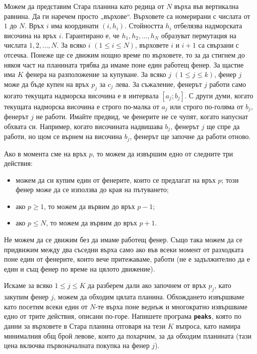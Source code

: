 \documentclass[12pt]{article}
\begin{document}
\renewcommand{\headerLang}{Български}
\renewcommand{\problemName}{?. PEAKS}

\renewcommand{\headerLeft}{IATI Day 1, Senior group}
\renewcommand{\headerRightFirst}{XVI INTERNATIONAL ADVANCED TOURNAMENT IN INFORMATICS}
\renewcommand{\headerRightSecond}{SHUMEN 2025}

\renewcommand{\tl}{$3$ сек.}
\renewcommand{\ml}{$256$ MB}
\problem{Задача \problemName}

Можем да представим Стара планина като редица от $N$ върха във вертикална равнина. Да ги наречем просто „върхове“. Върховете са номерирани с числата от $1$ до $N$. Връх $i$ има координати $(i, h_i)$. Стойността $h_i$ отбелязва надморската височина на връх $i$. Гарантирано е, че $h_1, h_2, \dots, h_ N$ образуват пермутация на числата $1, 2, \dots,  N$. За всяко $i$ $(1 \le i \le  N)$, върховете $i$ и $i+1$ са свързани с отсечка. Понеже ще се движим нощно време по върховете, то за да стигнем до някоя част на планината трябва да имаме поне един работещ фенер. За щастие има $K$ фенера на разположение за купуване. За всяко $j$ $(1 \le j \le k)$, фенер $j$ може да бъде купен на връх $p_j$ за $c_j$ лева. За съжаление, фенерът $j$ работи само когато текущата надморска височина е в интервала $[a_j; b_j]$. С други думи, когато текущата надморска височина е строго по-малка от $a_j$ или строго по-голяма от $b_j$, фенерът $j$ не работи. Имайте предвид, че фенерите не се чупят, когато напуснат обхвата си. Например, когато височината надвишава $b_j$, фенерът $j$ ще спре да работи, но щом се върнем на височина $b_j$, фенерът ще започне да работи отново.

Ако в момента сме на връх $p$, то можем да извършим едно от следните три действия:
\begin{itemize}
	\item можем да си купим един от фенерите, които се предлагат на връх $p$; този фенер може да се използва до края на пътуването;
	\item ако $p \ge 1$, то можем да вървим до връх $p-1$;
	\item ако $p \le  N$, то можем да вървим до връх $p+1$.
\end{itemize}
Не можем да се движим без да имаме работещ фенер. Също така можем да се придвижим между два съседни върха само ако във всеки момент от разходката поне един от фенерите, които вече притежаваме, работи (не е задължително да е един и същ фенер по време на цялото движение).

Искаме за всяко $1 \le j \le K$ да разберем дали ако започнем от връх $p_j$, като закупим фенер $j$, можем да обходим цялата планина. Обхождането извършваме като посетим всеки един от $N$-те върха поне веднъж и многократно извършваме едно от трите действия, описани по-горе. Напишете програма \textbf{\texttt{peaks}}, която по данни за върховете в Стара планина отговаря на тези $K$ въпроса, като намира минималния общ брой левове, които да похарчим, за да обходим планината (тази цена включва първоначалната покупка на фенер $j$).
\end{document}
